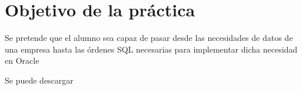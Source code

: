 
\usepackage{eurosym}

\newcommand{\anio}{2019}




\renewcommand{\hmwkTitle}{Diseño E/R, paso a SQL e inserción de datos}
\renewcommand{\hmwkClass}{Gestión de Bases de Datos}

\usepackage{enumitem}%






\primerapagina


\section{Objetivo de la práctica}
Se pretende que el alumno sea capaz de pasar desde las necesidades de datos de una empresa hasta las órdenes SQL necesarias para implementar dicha necesidad en Oracle

Se puede descargar 

